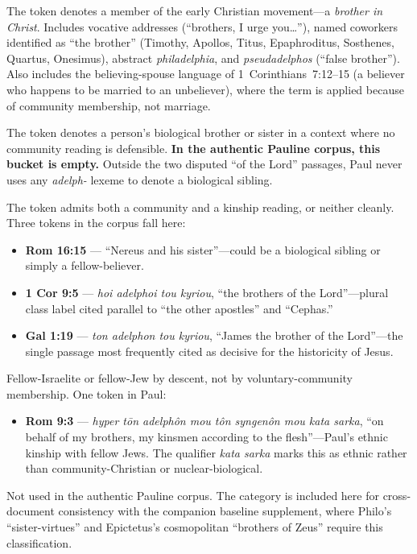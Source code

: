 \documentclass[11pt,oneside]{article}
\newcommand{\adeA}[1]{\textcolor{colorA}{\textbf{#1}}}
\newcommand{\adeB}[1]{\textcolor{colorB}{\textbf{#1}}}
\newcommand{\adeC}[1]{\textcolor{colorC}{\textbf{#1}}}
\newcommand{\adeD}[1]{\textcolor{colorD}{\textbf{#1}}}
\newcommand{\adeE}[1]{\textcolor{colorE}{\textbf{#1}}}
\begin{document}
\begin{description}[leftmargin=2em]
\item[\adeA{A — Community / fellow-believer}] The token denotes a member
of the early Christian movement---a \textit{brother in Christ}.  Includes
vocative addresses (``brothers, I urge you\ldots''), named coworkers
identified as ``the brother'' (Timothy, Apollos, Titus, Epaphroditus,
Sosthenes, Quartus, Onesimus), abstract \textit{philadelphia}, and
\textit{pseudadelphos} (``false brother'').  Also includes the
believing-spouse language of 1~Corinthians~7:12--15 (a believer who
happens to be married to an unbeliever), where the term is applied
because of community membership, not marriage.

\item[\adeB{B — Unambiguously biological sibling}] The token denotes a
person's biological brother or sister in a context where no community
reading is defensible.  \textbf{In the authentic Pauline corpus, this
bucket is empty.}  Outside the two disputed ``of the Lord'' passages,
Paul never uses any \textit{adelph-} lexeme to denote a biological
sibling.

\item[\adeC{C — Disputed or ambiguous}] The token admits both a
community and a kinship reading, or neither cleanly.  Three tokens in
the corpus fall here:
\begin{itemize}[leftmargin=2em]
\item \textbf{Rom 16:15} — ``Nereus and his sister''---could be a
biological sibling or simply a fellow-believer.
\item \textbf{1 Cor 9:5} — \textit{hoi adelphoi tou kyriou}, ``the
brothers of the Lord''---plural class label cited parallel to ``the
other apostles'' and ``Cephas.''
\item \textbf{Gal 1:19} — \textit{ton adelphon tou kyriou}, ``James
the brother of the Lord''---the single passage most frequently cited
as decisive for the historicity of Jesus.
\end{itemize}

\item[\adeD{D — Ethnic / tribal / covenantal kinship}] Fellow-Israelite
or fellow-Jew by descent, not by voluntary-community membership.  One
token in Paul:
\begin{itemize}[leftmargin=2em]
\item \textbf{Rom 9:3} — \textit{hyper t\=on adelph\^on mou t\^on
syngen\^on mou kata sarka}, ``on behalf of my brothers, my kinsmen
according to the flesh''---Paul's ethnic kinship with fellow Jews.
The qualifier \textit{kata sarka} marks this as ethnic rather than
community-Christian or nuclear-biological.
\end{itemize}

\item[\adeE{E — Literary / metaphorical extension}] Not used in the
authentic Pauline corpus.  The category is included here for
cross-document consistency with the companion baseline supplement,
where Philo's ``sister-virtues'' and Epictetus's cosmopolitan
``brothers of Zeus'' require this classification.
\end{description}
\end{document}
